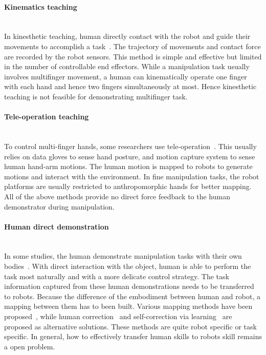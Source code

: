 \paragraph{Kinematics teaching} ~\\
In kinesthetic teaching, human directly contact with the robot and guide their movements to accomplish a task~\cite{korkinof2013online,pais2014encoding,pastor2011skill,Miao2014}. The trajectory of movements and contact force are recorded by the robot sensors.
This method is simple and effective but limited in the number of controllable end effectors. While a manipulation task usually involves multifinger movement, a human can kinematically operate one finger with each hand and hence two fingers simultaneously at most. Hence kinesthetic teaching is not feasible for demonstrating multifinger task.

\paragraph{Tele-operation teaching} ~\\
To control multi-finger hands, some researchers use tele-operation~\cite{bernardino2013precision,kondo2008recognition,Fischer98}. This usually relies on data gloves to sense hand posture, and motion capture system to sense human hand-arm motions. The human motion is mapped to robots to generate motions and interact with the environment. In fine manipulation tasks, the robot platforms are usually restricted to anthropomorphic hands for better mapping. All of the above methods provide no direct force feedback to the human demonstrator during manipulation.

\paragraph{Human direct demonstration} ~\\
In some studies, the human demonstrate manipulation tasks with their own bodies~\cite{asfour2008imitation}. With direct interaction with the object, human is able to perform the task most naturally and with a more delicate control strategy. The task information captured from these human demonstrations needs to be transferred to robots. Because the difference of the embodiment between human and robot, a mapping between them has to been built. Various mapping methods have been proposed~\cite{do2011towards,asfour2008imitation,hueser2006learning}, while human correction~\cite{calinon2007incremental,sauser2011iterative,romano2011human} and self-correction via learning~\cite{bidan2013robio} are proposed as alternative solutions. These methods are quite robot specific or task specific. In general, how to effectively transfer human skills to robots skill remains a open problem.

